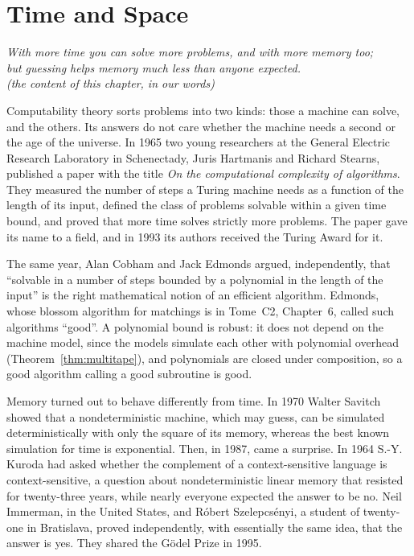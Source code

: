 \chapter{Time and Space}\label{ch:timespace}

\begin{center}\itshape
With more time you can solve more problems, and with more memory too;\\
but guessing helps memory much less than anyone expected.\\
\upshape(the content of this chapter, in our words)
\end{center}

Computability theory sorts problems into two kinds: those a machine can solve, and the others. Its answers do not care whether the machine needs a second or the age of the universe. In 1965 two young researchers at the General Electric Research Laboratory in Schenectady, Juris Hartmanis and Richard Stearns, published a paper with the title \emph{On the computational complexity of algorithms}. They measured the number of steps a Turing machine needs as a function of the length of its input, defined the class of problems solvable within a given time bound, and proved that more time solves strictly more problems. The paper gave its name to a field, and in 1993 its authors received the Turing Award for it.

The same year, Alan Cobham and Jack Edmonds argued, independently, that ``solvable in a number of steps bounded by a polynomial in the length of the input'' is the right mathematical notion of an efficient algorithm. Edmonds, whose blossom algorithm for matchings is in Tome~C2, Chapter~6, called such algorithms ``good''. A polynomial bound is robust: it does not depend on the machine model, since the models simulate each other with polynomial overhead (Theorem~\ref{thm:multitape}), and polynomials are closed under composition, so a good algorithm calling a good subroutine is good.

Memory turned out to behave differently from time. In 1970 Walter Savitch showed that a nondeterministic machine, which may guess, can be simulated deterministically with only the square of its memory, whereas the best known simulation for time is exponential. Then, in 1987, came a surprise. In 1964 S.-Y. Kuroda had asked whether the complement of a context-sensitive language is context-sensitive, a question about nondeterministic linear memory that resisted for twenty-three years, while nearly everyone expected the answer to be no. Neil Immerman, in the United States, and Róbert Szelepcsényi, a student of twenty-one in Bratislava, proved independently, with essentially the same idea, that the answer is yes. They shared the Gödel Prize in 1995.

